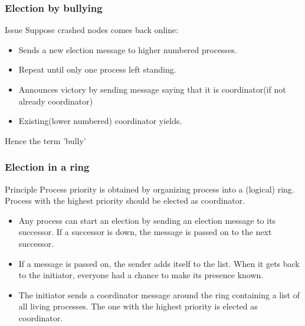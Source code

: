 \begin{frame}
    \frametitle{Election by bullying}
    \begin{block}{Issue}
    Suppose crashed nodes comes back online:
    \begin{itemize}
        \item Sends a new election message to higher numbered processes.
        \item Repeat until only one process left standing.
        \item Announces victory by sending message saying that it is coordinator(if not already coordinator)
        \item Existing(lower numbered) coordinator yields.
    \end{itemize}
    \end{block}
    Hence the term 'bully'
\end{frame}

\begin{frame}
    \frametitle{Election in a ring}
    \begin{block}{Principle}
        Process priority is obtained by organizing process into a (logical) ring. Process with the highest priority should be elected as coordinator.
    \end{block}

    \begin{itemize}
        \item Any process can start an election by sending an election message to its successor. If a successor is down, the message is passed on to the next successor.
        \item If a message is passed on, the sender adds itself to the list. When it gets back to the initiator, everyone had a chance to make its presence known.
        \item The initiator sends a coordinator message around the ring containing a list of all living processes. The one with the highest priority is elected as coordinator.
    \end{itemize}
\end{frame}

